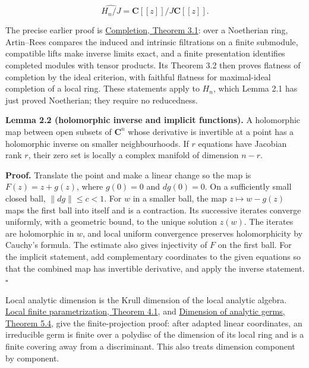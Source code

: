\documentclass[11pt]{article}
\begin{document}
\[
\widehat{H_n/J}=\mathbf C[[z]]/J\mathbf C[[z]].
\]

The precise earlier proof is
\href{../AG-CA/AG-CA-19.html\#3-noetherian-exactness-tensoring-and-flatness}{Completion,
Theorem 3.1}: over a Noetherian ring, Artin--Rees compares the induced
and intrinsic filtrations on a finite submodule, compatible lifts make
inverse limits exact, and a finite presentation identifies completed
modules with tensor products. Its Theorem 3.2 then proves flatness of
completion by the ideal criterion, with faithful flatness for
maximal-ideal completion of a local ring. These statements apply to
\(H_n\), which Lemma 2.1 has just proved Noetherian; they require no
reducedness.

\textbf{Lemma 2.2 (holomorphic inverse and implicit functions).} A
holomorphic map between open subsets of \(\mathbf C^n\) whose derivative
is invertible at a point has a holomorphic inverse on smaller
neighbourhoods. If \(r\) equations have Jacobian rank \(r\), their zero
set is locally a complex manifold of dimension \(n-r\).

\textbf{Proof.} Translate the point and make a linear change so the map
is \(F(z)=z+g(z)\), where \(g(0)=0\) and \(dg(0)=0\). On a sufficiently
small closed ball, \(\|dg\|\leq c<1\). For \(w\) in a smaller ball, the
map \(z\mapsto w-g(z)\) maps the first ball into itself and is a
contraction. Its successive iterates converge uniformly, with a
geometric bound, to the unique solution \(z(w)\). The iterates are
holomorphic in \(w\), and local uniform convergence preserves
holomorphicity by Cauchy's formula. The estimate also gives injectivity
of \(F\) on the first ball. For the implicit statement, add
complementary coordinates to the given equations so that the combined
map has invertible derivative, and apply the inverse statement.
\(\square\)

Local analytic dimension is the Krull dimension of the local analytic
algebra.
\href{../complex-analytic-spaces-and-coherent-sheaves/analytic-germs-local-parametrization-and-the-nullstellensatz.html\#4-the-local-parametrization-theorem}{Local
finite parametrization, Theorem 4.1}, and
\href{../complex-analytic-spaces-and-coherent-sheaves/analytic-germs-local-parametrization-and-the-nullstellensatz.html\#5-the-nullstellensatz-and-dimension}{Dimension
of analytic germs, Theorem 5.4}, give the finite-projection proof: after
adapted linear coordinates, an irreducible germ is finite over a
polydisc of the dimension of its local ring and is a finite covering
away from a discriminant. This also treats dimension component by
component.
\end{document}
